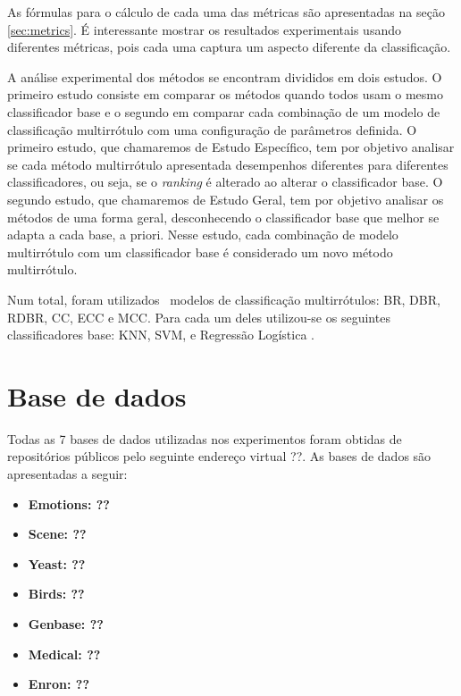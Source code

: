 As fórmulas para o cálculo de cada uma das métricas são apresentadas na seção \ref{sec:metrics}.
É interessante mostrar os resultados experimentais usando diferentes métricas, pois cada uma captura
um aspecto diferente da classificação. 

A análise experimental dos métodos se encontram divididos em dois estudos. O primeiro estudo consiste em
comparar os métodos quando todos usam o mesmo classificador base e o segundo em comparar cada combinação de um
modelo de classificação multirrótulo com uma configuração de parâmetros definida. 
O primeiro estudo, que chamaremos de Estudo Específico, tem por objetivo analisar se cada método multirrótulo apresentada desempenhos diferentes para
diferentes classificadores, ou seja, se o \textit{ranking} é alterado ao alterar o classificador base.
O segundo estudo, que chamaremos de Estudo Geral,
tem por objetivo analisar os métodos de uma forma geral,
desconhecendo o classificador base que melhor se adapta a cada base, a priori.
Nesse estudo, cada combinação de modelo multirrótulo com um classificador base é considerado
um novo método multirrótulo.

Num total, foram utilizados \Nml~modelos de classificação multirrótulos: BR, DBR, RDBR, CC, ECC e MCC.
Para cada um deles utilizou-se os seguintes classificadores base: KNN, SVM, \jqo e Regressão Logística \cite{classificadoresbases}. 


\section{Base de dados}
\label{sec:datas}
Todas as 7 bases de dados utilizadas nos experimentos foram obtidas de repositórios públicos pelo seguinte endereço virtual ??.
As bases de dados são apresentadas a seguir:

\begin{itemize}
\item \bf{Emotions}: ??
\item \bf{Scene}: ??
\item \bf{Yeast}: ??
\item \bf{Birds}: ??
\item \bf{Genbase}: ??
\item \bf{Medical}: ??
\item \bf{Enron}: ??	

\end{itemize}

